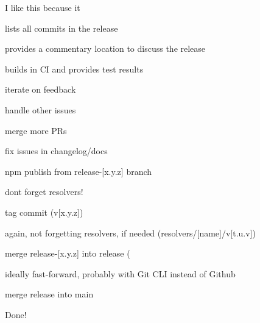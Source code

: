 \begin{DoxyEnumerate}
I like this because it
\begin{DoxyItemize}
\item lists all commits in the release
\item provides a commentary location to discuss the release
\item builds in CI and provides test results
\end{DoxyItemize}
\item iterate on feedback
\begin{DoxyItemize}
\item handle other issues
\item merge more PRs
\item fix issues in changelog/docs
\end{DoxyItemize}
\item {\ttfamily npm publish} from {\ttfamily release-\/\mbox{[}x.\+y.\+z\mbox{]}} branch
\begin{DoxyItemize}
\item don\textquotesingle{}t forget resolvers!
\end{DoxyItemize}
\item tag commit ({\ttfamily v\mbox{[}x.\+y.\+z\mbox{]}})
\begin{DoxyItemize}
\item again, not forgetting resolvers, if needed ({\ttfamily resolvers/\mbox{[}name\mbox{]}/v\mbox{[}t.\+u.\+v\mbox{]}})
\end{DoxyItemize}
\item merge {\ttfamily release-\/\mbox{[}x.\+y.\+z\mbox{]}} into {\ttfamily release} (
\begin{DoxyItemize}
\item ideally fast-\/forward, probably with Git CLI instead of Github
\end{DoxyItemize}
\item merge {\ttfamily release} into {\ttfamily main}
\end{DoxyEnumerate}

Done! 